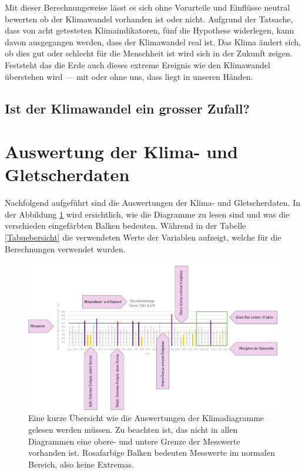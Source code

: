 \begin{refsection}
Mit dieser Berechnungsweise lässt es sich ohne Vorurteile und Einflüsse neutral bewerten ob der Klimawandel vorhanden ist oder nicht. Aufgrund der Tatsache, dass von acht getesteten Klimaindikatoren, fünf die Hypothese widerlegen, kann davon ausgegangen werden, dass der Klimawandel real ist. Das Klima ändert sich, ob dies gut oder schlecht für die Menschheit ist wird sich in der Zukunft zeigen. Feststeht das die Erde auch dieses extreme Ereignis wie den Klimawandel überstehen wird --- mit oder ohne uns, dass liegt in unseren Händen.

\subsection{Ist der Klimawandel ein grosser Zufall?}


\section{Auswertung der Klima- und Gletscherdaten} \label{AuswertungKG}
Nachfolgend aufgeführt sind die Auswertungen der Klima- und Gletscherdaten. In der Abbildung \ref{KlimaDia} wird ersichtlich, wie die Diagramme zu lesen sind und was die verschieden eingefärbten Balken bedeuten. Während in der Tabelle \ref{Tabuebersicht} die verwendeten Werte der Variablen aufzeigt, welche für die Berechnungen verwendet wurden.

\begin{figure}
\centering
\includegraphics[width=1.0\textwidth]{extrem/Klimadiagrammlesen.pdf}
\caption{Eine kurze Übersicht wie die Auswertungen der Klimadiagramme gelesen werden müssen. Zu beachten ist, das nicht in allen Diagrammen eine obere- und untere Grenze der Messwerte vorhanden ist. Rosafarbige Balken bedeuten Messwerte im normalen Bereich, also keine Extremas.}
\label{KlimaDia}
\end{figure}


\end{refsection}
